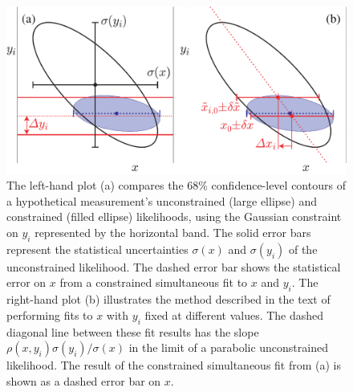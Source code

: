 \begin{figure}
\begin{center}
\includegraphics[width=6.0in]{figures/meth/figure1}
\end{center}
\caption{The left-hand plot (a) compares the 68\% confidence-level
  contours of a
  hypothetical measurement's unconstrained (large ellipse) and
  constrained (filled ellipse) likelihoods, using the Gaussian
  constraint on $y_i$ represented by the horizontal band. The solid
  error bars represent the statistical uncertainties $\sigma(x)$ and
  $\sigma(y_i)$ of the unconstrained likelihood. The dashed
  error bar shows the statistical error on $x$ from a
  constrained simultaneous fit to $x$ and $y_i$. The right-hand plot
  (b) illustrates the method described in the text of performing fits
  to $x$ with $y_i$ fixed at different values. The dashed
  diagonal line between these fit results has the slope
  $\rho(x,y_i)\sigma(y_i)/\sigma(x)$ in the limit of a parabolic
  unconstrained likelihood. The result of the constrained simultaneous
  fit from (a) is shown as a dashed error bar on $x$.}
\label{fig:singlefit}
\end{figure}

